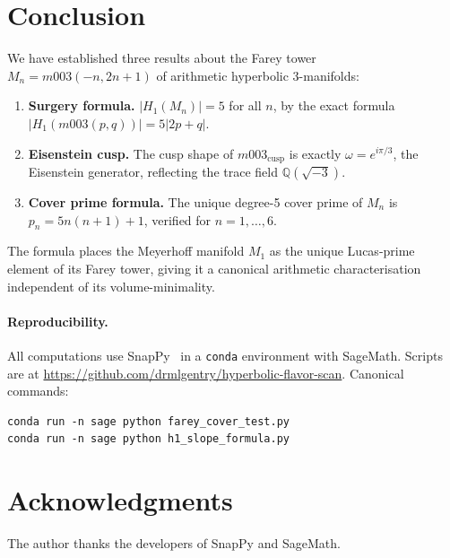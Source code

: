 \documentclass[11pt,a4paper]{article}
\theoremstyle{definition}
\newcommand{\QQ}{\mathbb{Q}}
\newcommand{\Mn}{M_n}
\newcommand{\Mcusp}{m003_{\mathrm{cusp}}}
\begin{document}
\section{Conclusion}
\label{sec:conclusion}

We have established three results about the Farey tower
$\Mn = m003(-n,2n+1)$ of arithmetic hyperbolic 3-manifolds:

\begin{enumerate}
\item \textbf{Surgery formula.} $|H_1(\Mn)| = 5$ for all $n$,
  by the exact formula $|H_1(m003(p,q))| = 5|2p+q|$.
\item \textbf{Eisenstein cusp.} The cusp shape of $\Mcusp$ is
  exactly $\omega = e^{i\pi/3}$, the Eisenstein generator,
  reflecting the trace field $\QQ(\sqrt{-3})$.
\item \textbf{Cover prime formula.} The unique degree-5
  cover prime of $\Mn$ is $p_n = 5n(n+1)+1$,
  verified for $n=1,\ldots,6$.
\end{enumerate}

The formula places the Meyerhoff manifold $M_1$ as the unique
Lucas-prime element of its Farey tower, giving it a canonical
arithmetic characterisation independent of its volume-minimality.

\paragraph{Reproducibility.}
All computations use SnapPy~\cite{SnapPy} in a \texttt{conda}
environment with SageMath.
Scripts are at
\url{https://github.com/drmlgentry/hyperbolic-flavor-scan}.
Canonical commands:
\begin{verbatim}
conda run -n sage python farey_cover_test.py
conda run -n sage python h1_slope_formula.py
\end{verbatim}

\section*{Acknowledgments}
The author thanks the developers of SnapPy and SageMath.
\end{document}

